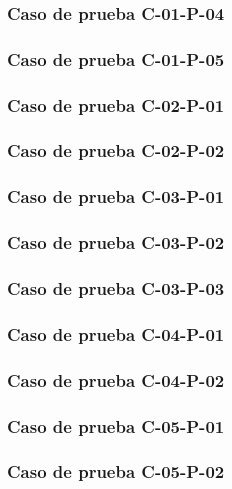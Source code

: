 \documentclass[10pt,a4paper]{article}
\begin{document}
			\subsubsection{Caso de prueba C-01-P-04}

			\subsubsection{Caso de prueba C-01-P-05}

			\subsubsection{Caso de prueba C-02-P-01}

			\subsubsection{Caso de prueba C-02-P-02}

			\subsubsection{Caso de prueba C-03-P-01}

			\subsubsection{Caso de prueba C-03-P-02}

			\subsubsection{Caso de prueba C-03-P-03}

			\subsubsection{Caso de prueba C-04-P-01}

			\subsubsection{Caso de prueba C-04-P-02}

			\subsubsection{Caso de prueba C-05-P-01}

			\subsubsection{Caso de prueba C-05-P-02}
\end{document}
